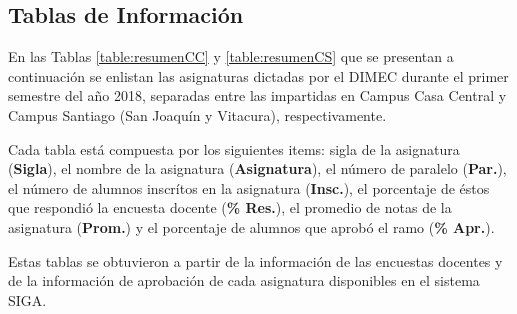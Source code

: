\documentclass[12pt]{article}
\begin{document}
\subsection{Tablas de Información}
\begin{text}
En las Tablas \ref{table:resumenCC} y \ref{table:resumenCS} que se presentan a continuación se enlistan las asignaturas dictadas por el DIMEC durante el primer semestre del año 2018, separadas entre las impartidas en Campus Casa Central y Campus Santiago (San Joaquín y Vitacura), respectivamente.
\par
Cada tabla está compuesta por los siguientes items: sigla de la asignatura (\textbf{Sigla}), el nombre de la asignatura (\textbf{Asignatura}), el número de paralelo (\textbf{Par.}), el número de alumnos inscrítos en la asignatura (\textbf{Insc.}), el porcentaje de éstos que respondió la encuesta docente (\textbf{\% Res.}), el promedio de notas de la asignatura (\textbf{Prom.}) y el porcentaje de alumnos que aprobó el ramo (\textbf{\% Apr.}).
\par
Estas tablas se obtuvieron a partir de la información de las encuestas docentes y de la información de aprobación de cada asignatura disponibles en el sistema SIGA. 
\par
\end{text}
\end{document}
